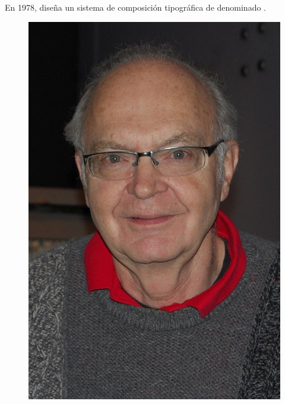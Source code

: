 \documentclass{beamer}
\begin{document}
\begin{frame}
  \frametitle{}

  En 1978,  dise\~na un sistema de composici\'on
  tipogr\'afica de  denominado \structure{\TeX}.
  \vspace{20px}
  
  \begin{figure}
    \centering
    \includegraphics[scale=0.15]{img/Donald_Knuth.jpg}
    
  \end{figure}
\end{frame}


\end{document}
